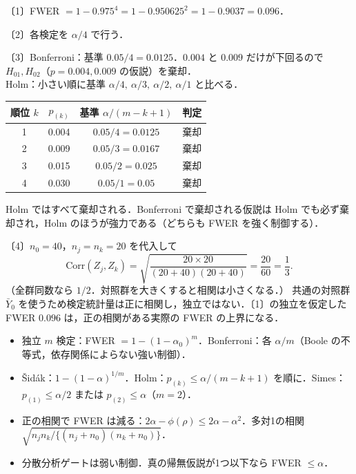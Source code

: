 \documentclass[a4paper,11pt,openany]{ltjsbook}
\newenvironment{kaitou}[1]{%
  \par\medskip\noindent
  \begin{tcolorbox}[enhanced,breakable,colback=bkgray!3,colframe=bkgray!60,boxrule=0.4pt,
    left=4pt,right=4pt,top=2pt,bottom=2pt,arc=1pt,
    title={\cref{#1}の解答},fonttitle=\bfseries\small,coltitle=white,colbacktitle=bkgray!80]}%
  {\end{tcolorbox}\par}
\newcommand{\Corr}{\mathrm{Corr}}
\begin{document}
\begin{kaitou}{reidai:m08-2}
〔1〕FWER $=1-0.975^4=1-0.950625^2=1-0.9037=0.096$．

〔2〕各検定を $\alpha/4$ で行う．

〔3〕Bonferroni：基準 $0.05/4=0.0125$．$0.004$ と $0.009$ だけが下回るので $H_{01},H_{02}$（$p=0.004,0.009$ の仮説）を棄却．\\
Holm：小さい順に基準 $\alpha/4,\ \alpha/3,\ \alpha/2,\ \alpha/1$ と比べる．
\begin{center}\small
\begin{tabular}{@{}cccc@{}}
\toprule
順位 $k$ & $p_{(k)}$ & 基準 $\alpha/(m-k+1)$ & 判定\\
\midrule
1 & 0.004 & $0.05/4=0.0125$ & 棄却\\
2 & 0.009 & $0.05/3=0.0167$ & 棄却\\
3 & 0.015 & $0.05/2=0.025$ & 棄却\\
4 & 0.030 & $0.05/1=0.05$ & 棄却\\
\bottomrule
\end{tabular}
\end{center}
Holm ではすべて棄却される．Bonferroni で棄却される仮説は Holm でも必ず棄却され，Holm のほうが強力である（どちらも FWER を強く制御する）．

〔4〕$n_0=40$，$n_j=n_k=20$ を代入して
\[
\Corr(Z_j,Z_k)=\sqrt{\frac{20\times20}{(20+40)(20+40)}}=\frac{20}{60}=\frac13 .
\]
（全群同数なら $1/2$．対照群を大きくすると相関は小さくなる．）
共通の対照群 $\bar Y_0$ を使うため検定統計量は正に相関し，独立ではない．〔1〕の独立を仮定した FWER $0.096$ は，正の相関がある実際の FWER の上界になる．
\end{kaitou}

\begin{summarybox}
\begin{itemize}
\item 独立 $m$ 検定：FWER $=1-(1-\alpha_0)^m$．Bonferroni：各 $\alpha/m$（Boole の不等式，依存関係によらない強い制御）．
\item Šidák：$1-(1-\alpha)^{1/m}$．Holm：$p_{(k)}\le\alpha/(m-k+1)$ を順に．Simes：$p_{(1)}\le\alpha/2$ または $p_{(2)}\le\alpha$（$m=2$）．
\item 正の相関で FWER は減る：$2\alpha-\phi(\rho)\le2\alpha-\alpha^2$．多対1の相関 $\sqrt{n_jn_k/\{(n_j+n_0)(n_k+n_0)\}}$．
\item 分散分析ゲートは弱い制御．真の帰無仮説が1つ以下なら FWER $\le\alpha$．
\end{itemize}
\end{summarybox}
\end{document}
